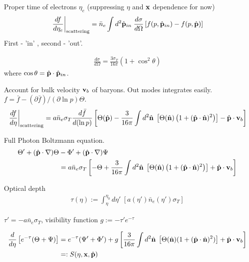 Proper time of electrons $\eta_e$ (suppressing $\eta$ and $\mathbf{x}$ dependence for now)
\begin{align}
	\left. \frac{df}{d\eta_e} \right|_\text{scattering} = \bar{n}_e \int d^2 \hat{\mathbf{p}}_{in} \; \frac{d\sigma}{d\Omega} \left[ f(p,\hat{\mathbf{p}}_{in}) - f(p,\hat{\mathbf{p}})\right]
\end{align}
First - 'in' , second - 'out'.

\begin{align}
	\frac{d\sigma}{d\Omega} = \frac{3\sigma_T}{16\pi} (1 + \cos^2 \theta)
\end{align}
where $\cos\theta = \hat{\mathbf{p}} \cdot \hat{\mathbf{p}}_{in}$.

Account for bulk velocity $\mathbf{v}_b$ of baryons. Out modes integrates easily. $f = \bar{f} - (\partial\bar{f})/(\partial\ln p) \Theta$.
\begin{align}
	\left. \frac{df}{d\eta} \right|_\text{scattering} = a \bar{n}_e \sigma_T \frac{d\bar{f}}{d(\ln p)}  \left[ \Theta(\hat{\mathbf{p}}) - \frac{3}{16\pi} \int d^2 \hat{\mathbf{n}} \; \left[ \Theta(\hat{\mathbf{n}}) \left( 1 + (\hat{\mathbf{p}} \cdot \hat{\mathbf{n}})^2 \right) \right] - \hat{\mathbf{p}} \cdot \mathbf{v}_b \right]
\end{align}

Full Photon Boltzmann equation.
\begin{align}
	\Theta' + (\hat{\mathbf{p}} \cdot \nabla) \Theta &- \Phi' +(\hat{\mathbf{p}} \cdot \nabla) \Psi  \nonumber \\	
	&= a \bar{n}_e \sigma_T \left[ -\Theta + \frac{3}{16\pi} \int d^2 \hat{\mathbf{n}} \; \left[ \Theta(\hat{\mathbf{n}}) \left( 1 + (\hat{\mathbf{p}} \cdot \hat{\mathbf{n}})^2 \right) \right] + \hat{\mathbf{p}} \cdot \mathbf{v}_b \right] 
\end{align}

Optical depth
\begin{align}
	\tau(\eta) := \int_\eta^{\eta_0} d\eta'\; \left[ a(\eta') \bar{n}_e (\eta') \sigma_T \right]
\end{align}

$\tau' = -a \bar{n}_e \sigma_T$, visibility function $g:=-\tau'e^{-\tau}$

\begin{align}
	\frac{d}{d\eta} \left[ e^{-\tau} (\Theta + \Psi) \right] &= e^{-\tau}(\Psi' + \Phi') + g \left[ \frac{3}{16\pi} \int d^2\hat{\mathbf{n}} \; \left[ \Theta(\hat{\mathbf{n}}) (1 + (\hat{\mathbf{p}} \cdot \hat{\mathbf{n}})^2) \right] + \hat{\mathbf{p}} \cdot \mathbf{v}_b \right] \\
	&=: S(\eta, \mathbf{x}, \hat{\mathbf{p}})
\end{align}

